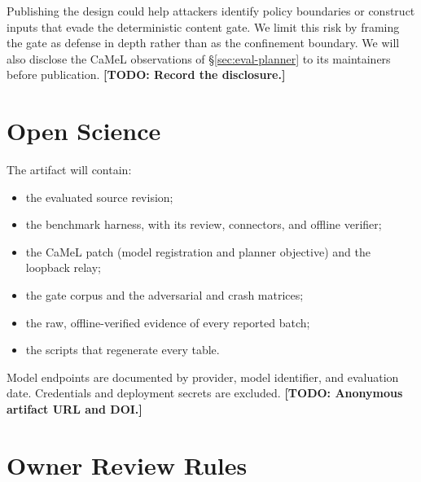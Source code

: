 \documentclass[letterpaper,twocolumn,10pt]{article}
\newcommand{\todo}[1]{{\color{red}\textbf{[TODO: #1]}}}
\begin{document}
Publishing the design could help attackers identify policy boundaries or
construct inputs that evade the deterministic content gate. We limit this
risk by framing the gate as defense in depth rather than as the
confinement boundary. We will also disclose the CaMeL observations of
\S\ref{sec:eval-planner} to its maintainers before publication.
\todo{Record the disclosure.}

\section*{Open Science}

The artifact will contain:
\begin{itemize}
\item the evaluated source revision;
\item the benchmark harness, with its review, connectors, and offline
  verifier;
\item the CaMeL patch (model registration and planner objective) and the
  loopback relay;
\item the gate corpus and the adversarial and crash matrices;
\item the raw, offline-verified evidence of every reported batch;
\item the scripts that regenerate every table.
\end{itemize}
Model endpoints are documented by provider, model identifier, and
evaluation date. Credentials and deployment secrets are excluded.
\todo{Anonymous artifact URL and DOI.}




\appendix

\section{Owner Review Rules}
\label{app:review}
\end{document}

